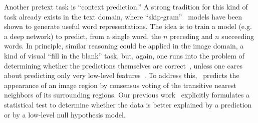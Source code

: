 \documentclass[10pt,twocolumn,letterpaper]{article}
\begin{document}




Another pretext task is ``context prediction.''
A strong tradition for this kind of task already exists in the text domain, where ``skip-gram''~\cite{mikolov2013distributed} models have been shown to generate useful word representations.  The idea is to train a model (e.g. a deep network) to predict, from a single word, the $n$ preceding and $n$ succeeding words.  In principle, similar reasoning could be applied in the image domain, a kind of visual ``fill in the blank'' task, but, again, one runs into the problem of determining whether the predictions themselves are correct~\cite{doersch2014context},
unless one cares about predicting only very low-level features~\cite{domke2008killed,larochelle2011neural,theis2015generative}.
To address this,~\cite{malisiewicz2009beyond} predicts the appearance of an image region by consensus voting of the transitive nearest neighbors of its surrounding regions. Our previous work~\cite{doersch2014context} explicitly formulates a statistical test to determine whether 
the data is better explained by a prediction or by a low-level null hypothesis model. 
\end{document}
